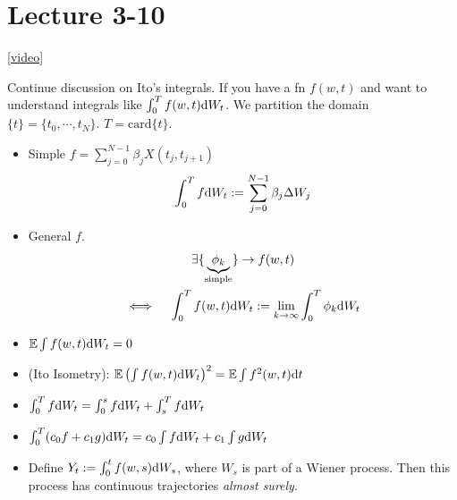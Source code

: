 \section{Lecture 3-10}

\href{https://cvn.hosted.panopto.com/Panopto/Pages/Viewer.aspx?id=56294e98-70c7-4526-a119-ace701137c35}{[video]}

Continue discussion on Ito's integrals. If you have a fn $f(w,t)$ and want to understand integrals like $\int_0^T f(w, t) \text{d} W_t$. We partition the domain $\{t\} = \{t_0 , \cdots, t_N\}$. $T = \text{card}\{ t\}$. 
\begin{itemize}
	\item Simple $f = \sum_{j=0}^{N-1} \beta_j X(t_j, t_{j+1})$
	\[ \int_0^T f \text{d} W_t := \sum_{j=0}^{N-1} \beta_j \Delta W_j \]
	\item General $f$. 
\begin{gather*} 
	\exists \{ \underbrace{ \phi_k }_{\text{simple}} \} \to f(w, t) \\
	\iff \quad 
		\int_0^T f(w, t) \text{d} W_t 
		:= \lim_{k\to\infty} \int_0^T \phi_k \text{d} W_t  
\end{gather*}
\end{itemize}

\begin{itemize}
	\item $\mathbb{E} \int f(w, t) \text{d} W_t = 0 $ 
	\item (Ito Isometry):
		$\mathbb{E} \left( \int f(w, t) \text{d} W_t \right)^2 = \mathbb{E} \int f^2(w, t) \text{d} t $
	\item $\int_0^T f\text{d} W_t = \int_0^s f \text{d} W_t + \int_s^T f \text{d} W_t$
	\item $\int_0^T (c_0f + c_1g)\text{d} W_t = c_0 \int f\text{d} W_t + c_1 \int g\text{d} W_t  $ 
	\item Define $Y_t := \int_0^t f(w, s) \text{d} W_s$, where $W_s$ is part of a Wiener process. Then this process has continuous trajectories \emph{almost surely}. 
\end{itemize}

